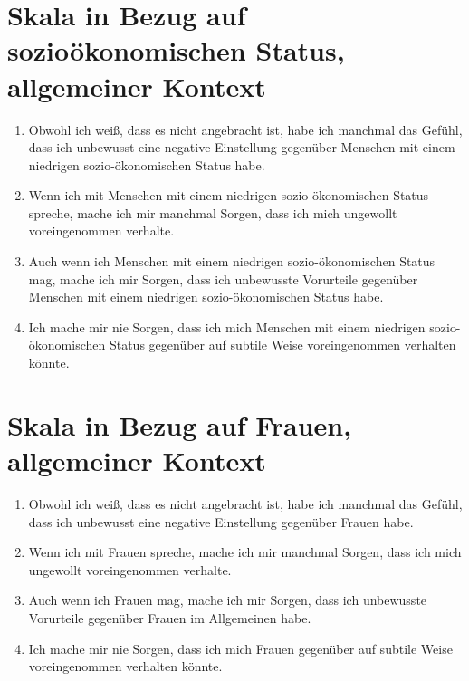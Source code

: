 \section*{Skala in Bezug auf sozioökonomischen Status, allgemeiner Kontext}
\label{app:skala-sozoek-allg}

\begin{enumerate}
	\item Obwohl ich weiß, dass es nicht angebracht ist, habe ich manchmal das Gefühl, dass ich unbewusst eine negative Einstellung gegenüber Menschen mit einem niedrigen sozio-ökonomischen Status habe.
	
	\item Wenn ich mit Menschen mit einem niedrigen sozio-ökonomischen Status spreche, mache ich mir manchmal Sorgen, dass ich mich ungewollt voreingenommen verhalte.
	
	\item Auch wenn ich Menschen mit einem niedrigen sozio-ökonomischen Status mag, mache ich mir Sorgen, dass ich unbewusste Vorurteile gegenüber Menschen mit einem niedrigen sozio-ökonomischen Status habe.
	
	\item Ich mache mir nie Sorgen, dass ich mich Menschen mit einem niedrigen sozio-ökonomischen Status gegenüber auf subtile Weise voreingenommen verhalten könnte.
\end{enumerate}


\section*{Skala in Bezug auf Frauen, allgemeiner Kontext}
\label{app:skala-frauen-allg}

\begin{enumerate}
	\item Obwohl ich weiß, dass es nicht angebracht ist, habe ich manchmal das Gefühl, dass ich unbewusst eine negative Einstellung gegenüber Frauen habe.
	
	\item Wenn ich mit Frauen spreche, mache ich mir manchmal Sorgen, dass ich mich ungewollt voreingenommen verhalte.
	
	\item Auch wenn ich Frauen mag, mache ich mir Sorgen, dass ich unbewusste Vorurteile gegenüber Frauen im Allgemeinen habe.
	
	\item Ich mache mir nie Sorgen, dass ich mich Frauen gegenüber auf subtile Weise voreingenommen verhalten könnte.
\end{enumerate}


